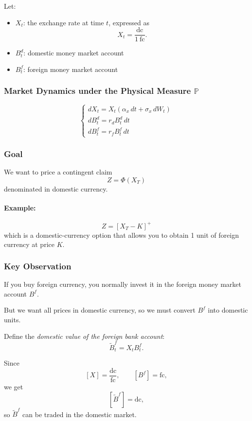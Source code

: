 \documentclass[12pt,a4paper]{article}
\theoremstyle{definition}
\begin{document}
Let:
\begin{itemize}
\item $X_t$: the exchange rate at time $t$, expressed as
\[
X_t = \frac{\text{dc}}{1\ \text{fc}}.
\]
\item $B_t^d$: domestic money market account
\item $B_t^f$: foreign money market account
\end{itemize}

\subsubsection{Market Dynamics under the Physical Measure $\mathbb{P}$}

\[
\begin{cases}
dX_t = X_t(\alpha_x\, dt + \sigma_x\, dW_t) \\
dB_t^d = r_d B_t^d\, dt \\
dB_t^f = r_f B_t^f\, dt
\end{cases}
\]

\subsubsection{Goal}

We want to price a contingent claim
\[
Z = \Phi(X_T)
\]
denominated in domestic currency.

\paragraph{Example:}

\[
Z = [X_T - K]^+
\]
which is a domestic-currency option that allows you to obtain 1 unit of foreign currency at price $K$.

\subsubsection{Key Observation}

If you buy foreign currency, you normally invest it in the foreign money market account $B^f$.

But we want all prices in domestic currency, so we must convert $B^f$ into domestic units.

Define the \emph{domestic value of the foreign bank account}:
\[
\widetilde{B}_t^f = X_t B_t^f.
\]

Since
\[
[X] = \frac{\text{dc}}{\text{fc}}, \qquad [B^f] = \text{fc},
\]
we get
\[
[\widetilde{B}^f] = \text{dc},
\]
so $\widetilde{B}^f$ can be traded in the domestic market.
\end{document}
